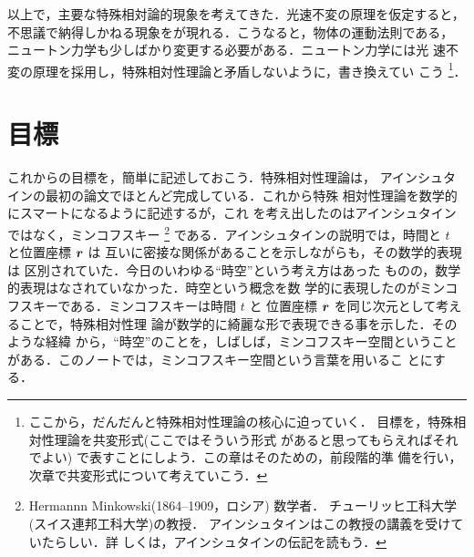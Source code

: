 \begin{mycomment}
    以上で，主要な特殊相対論的現象を考えてきた．光速不変の原理を仮定すると，
    不思議で納得しかねる現象をが現れる．こうなると，物体の運動法則である，
    ニュートン力学も少しばかり変更する必要がある．ニュートン力学には光
    速不変の原理を採用し，特殊相対性理論と矛盾しないように，書き換えてい
    こう
        \footnote{
            ここから，だんだんと特殊相対性理論の核心に迫っていく．
            目標を，特殊相対性理論を共変形式(ここではそういう形式
            があると思ってもらえればそれでよい)
            で表すことにしよう．この章はそのための，前段階的準
            備を行い，次章で共変形式について考えていこう．
        }．
\end{mycomment}

 \section{目標}
    これからの目標を，簡単に記述しておこう．特殊相対性理論は，
    アインシュタインの最初の論文でほとんど完成している．これから特殊
    相対性理論を数学的にスマートになるように記述するが，これ
    を考え出したのはアインシュタインではなく，ミンコフスキー
        \footnote{
            Hermannn Minkowski(1864--1909，ロシア) 数学者．
            チューリッヒ工科大学(スイス連邦工科大学)の教授．
            アインシュタインはこの教授の講義を受けていたらしい．詳
            しくは，アインシュタインの伝記を読もう．
        }
    である．アインシュタインの説明では，時間と $t$ と位置座標 $\boldsymbol{r}$ は
    互いに密接な関係があることを示しながらも，その数学的表現は
    区別されていた．今日のいわゆる“時空”という考え方はあった
    ものの，数学的表現はなされていなかった．時空という概念を数
    学的に表現したのがミンコフスキーである．ミンコフスキーは時間 $t$ と
    位置座標 $\boldsymbol{r}$ を同じ次元として考えることで，特殊相対性理
    論が数学的に綺麗な形で表現できる事を示した．そのような経緯
    から，“時空”のことを，しばしば，ミンコフスキー空間ということ
    がある．このノートでは，ミンコフスキー空間という言葉を用いるこ
    とにする．

